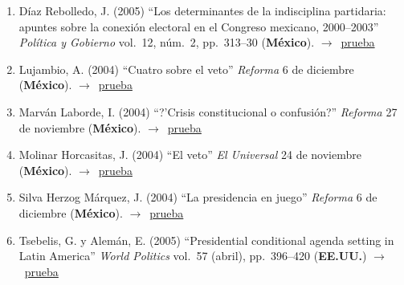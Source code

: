 \documentclass[12 pt, letter]{article}
\newenvironment{CitasMiTrabajo}{
    \begin{footnotesize}
    \begin{enumerate}[label={\footnotesize\emph{cita~\arabic*}},ref=\arabic*] %
        \setlength{\itemsep}{.1\itemsep}
        \setlength{\parskip}{.1\parskip}
    }{\end{enumerate}\end{footnotesize}}
\begin{document}
\begin{CitasMiTrabajo}
        \item D\'iaz Rebolledo, J. (2005)
        ``Los determinantes de la indisciplina partidaria: apuntes sobre la conexi\'on electoral en el Congreso mexicano, 2000--2003''
        \emph{Pol\'itica y Gobierno} vol.\ 12, n\'um.\ 2, pp.\ 313--30 (\textbf{M\'exico}). $\rightarrow$~\href{https://github.com/emagar/cv/blob/master/citasMiTrab/magarWeldonVeto/diazrebolledo2005pyg.pdf}{prueba}

        \item Lujambio, A. (2004) ``Cuatro sobre el veto''
        \emph{Reforma} 6 de diciembre (\textbf{M\'exico}). $\rightarrow$~\href{https://github.com/emagar/cv/blob/master/citasMiTrab/magarWeldonVeto/luj.pdf}{prueba}

        \item Marv\'an Laborde, I. (2004)
        ``?'Crisis constitucional o confusi\'on?'' \emph{Reforma} 27 de noviembre (\textbf{M\'exico}). $\rightarrow$~\href{https://github.com/emagar/cv/blob/master/citasMiTrab/magarWeldonVeto/marvan.pdf}{prueba}

        \item Molinar Horcasitas, J. (2004)
        ``El veto'' \emph{El Universal} 24 de noviembre (\textbf{M\'exico}). $\rightarrow$~\href{https://github.com/emagar/cv/blob/master/citasMiTrab/magarWeldonVeto/moli.pdf}{prueba}

        \item Silva Herzog M\'arquez, J. (2004) ``La presidencia en
        juego'' \emph{Reforma} 6 de diciembre (\textbf{M\'exico}). $\rightarrow$~\href{https://github.com/emagar/cv/blob/master/citasMiTrab/magarWeldonVeto/jshm.pdf}{prueba}

        \item Tsebelis, G. y Alem\'an, E. (2005)
        ``Presidential conditional agenda setting in Latin America'' \emph{World Politics} vol.\ 57 (abril), pp.\ 396--420 (\textbf{EE.UU.}) $\rightarrow$~\href{https://github.com/emagar/cv/blob/master/citasMiTrab/magarWeldonVeto/tsebal.pdf}{prueba}

        \label{ncites:magar.weldon.2001} %

        \end{CitasMiTrabajo}
\end{document}
